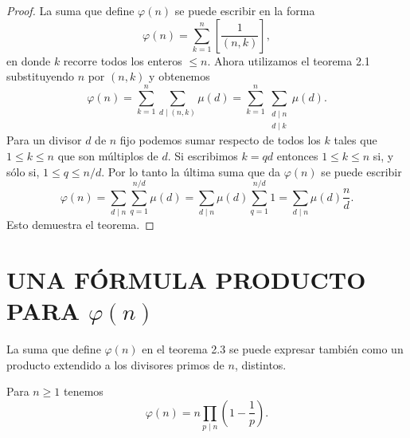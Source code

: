 \documentclass[12pt,a4paper]{book}
\begin{document}
    \begin{proof}
        La suma que define $\varphi(n)$ se puede escribir en la forma
        \begin{equation*}
            \varphi(n)=\sum_{k=1}^{n}\left[\frac{1}{(n,k)}\right],
        \end{equation*}
        en donde $k$ recorre todos los enteros $\leq n$. Ahora utilizamos el teorema 2.1
        substituyendo $n$ por $(n,k)$ y obtenemos
        \begin{equation*}
            \varphi(n)=\sum_{k=1}^{n}\sum_{d\mid(n,k)}\mu(d)
            =\sum_{k=1}^{n}\sum_{\substack{d\mid n\\ d\mid k}}\mu(d).
        \end{equation*}
        Para un divisor $d$ de $n$ fijo podemos sumar respecto de todos los $k$ tales que
        $1\leq k\leq n$ que son múltiplos de $d$. Si escribimos $k=qd$ entonces
        $1\leq k\leq n$ si, y sólo si, $1\leq q\leq n/d$. Por lo tanto la última suma que da
        $\varphi(n)$ se puede escribir
        \begin{equation*}
            \varphi(n)=\sum_{d\mid n}\sum_{q=1}^{n/d}\mu(d)
            =\sum_{d\mid n}\mu(d)\sum_{q=1}^{n/d}1=\sum_{d\mid n}\mu(d)\frac{n}{d}.
        \end{equation*}
        Esto demuestra el teorema.
    \end{proof}

    \section{UNA FÓRMULA PRODUCTO PARA \texorpdfstring{$\varphi(n)$}{φ(n)}}

    La suma que define $\varphi(n)$ en el teorema 2.3 se puede expresar también como un
    producto extendido a los divisores primos de $n$, distintos.

    \begin{teorema}
        Para $n\geq1$ tenemos
        \begin{equation}
            \varphi(n)=n\prod_{p\mid n}\left(1-\frac{1}{p}\right).
        \end{equation}
    \end{teorema}
\end{document}
